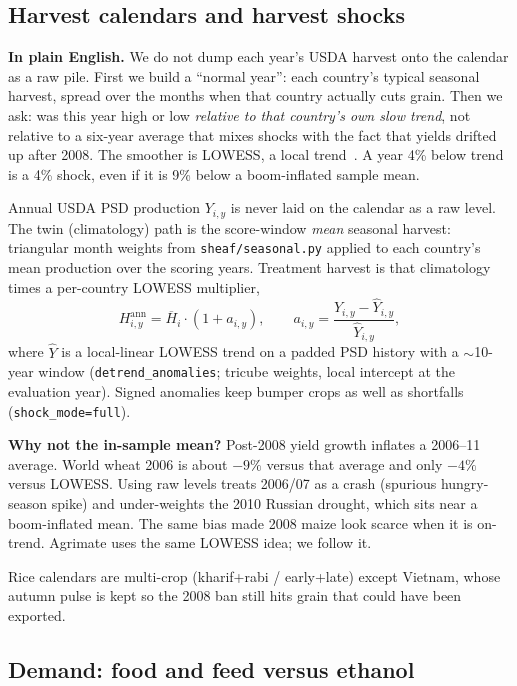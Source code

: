 \subsection{Harvest calendars and harvest shocks}
\label{sec:harvest}

\textbf{In plain English.} We do not dump each year's USDA harvest onto the
calendar as a raw pile. First we build a ``normal year'': each country's
typical seasonal harvest, spread over the months when that country actually
cuts grain. Then we ask: was this year high or low \emph{relative to that
country's own slow trend}, not relative to a six-year average that mixes
shocks with the fact that yields drifted up after 2008. The smoother is
LOWESS, a local trend~\citep{cleveland1979}. A year 4\% below trend is a
4\% shock, even if it is 9\% below a boom-inflated sample mean.

Annual USDA PSD production $Y_{i,y}$ is never laid on the calendar as a raw
level. The twin (climatology) path is the score-window \emph{mean} seasonal
harvest: triangular month weights from \texttt{sheaf/seasonal.py} applied to
each country's mean production over the scoring years. Treatment harvest is
that climatology times a per-country LOWESS multiplier,
\begin{equation}
\label{eq:harvest}
H_{i,y}^{\mathrm{ann}}=\overline{H}_i\cdot(1+a_{i,y}),
\qquad
a_{i,y}=\frac{Y_{i,y}-\hat Y_{i,y}}{\hat Y_{i,y}},
\end{equation}
where $\hat Y$ is a local-linear LOWESS trend on a padded PSD history with a
$\sim$10-year window (\texttt{detrend\_anomalies}; tricube weights, local
intercept at the evaluation year). Signed anomalies keep bumper crops as
well as shortfalls (\texttt{shock\_mode=full}).

\textbf{Why not the in-sample mean?} Post-2008 yield growth inflates a
2006--11 average. World wheat 2006 is about $-9\%$ versus that average and
only $-4\%$ versus LOWESS. Using raw levels treats 2006/07 as a crash
(spurious hungry-season spike) and under-weights the 2010 Russian drought,
which sits near a boom-inflated mean. The same bias made 2008 maize look
scarce when it is on-trend. Agrimate uses the same LOWESS idea; we follow it.

Rice calendars are multi-crop (kharif+rabi / early+late) except Vietnam,
whose autumn pulse is kept so the 2008 ban still hits grain that could have
been exported.

\subsection{Demand: food and feed versus ethanol}
\label{sec:demand}

